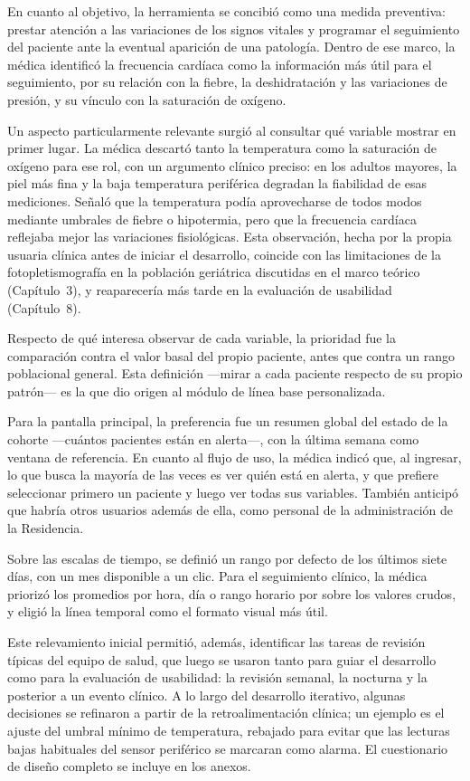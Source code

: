 \documentclass[12pt,a4paper]{article}
\begin{document}
    En cuanto al objetivo, la herramienta se concibió como una medida preventiva: prestar atención a las variaciones de los signos vitales y programar el seguimiento del paciente ante la eventual aparición de una patología. Dentro de ese marco, la médica identificó la frecuencia cardíaca como la información más útil para el seguimiento, por su relación con la fiebre, la deshidratación y las variaciones de presión, y su vínculo con la saturación de oxígeno.

    Un aspecto particularmente relevante surgió al consultar qué variable mostrar en primer lugar. La médica descartó tanto la temperatura como la saturación de oxígeno para ese rol, con un argumento clínico preciso: en los adultos mayores, la piel más fina y la baja temperatura periférica degradan la fiabilidad de esas mediciones. Señaló que la temperatura podía aprovecharse de todos modos mediante umbrales de fiebre o hipotermia, pero que la frecuencia cardíaca reflejaba mejor las variaciones fisiológicas. Esta observación, hecha por la propia usuaria clínica antes de iniciar el desarrollo, coincide con las limitaciones de la fotopletismografía en la población geriátrica discutidas en el marco teórico (Capítulo~3), y reaparecería más tarde en la evaluación de usabilidad (Capítulo~8).

    Respecto de qué interesa observar de cada variable, la prioridad fue la comparación contra el valor basal del propio paciente, antes que contra un rango poblacional general. Esta definición —mirar a cada paciente respecto de su propio patrón— es la que dio origen al módulo de línea base personalizada.

    Para la pantalla principal, la preferencia fue un resumen global del estado de la cohorte —cuántos pacientes están en alerta—, con la última semana como ventana de referencia. En cuanto al flujo de uso, la médica indicó que, al ingresar, lo que busca la mayoría de las veces es ver quién está en alerta, y que prefiere seleccionar primero un paciente y luego ver todas sus variables. También anticipó que habría otros usuarios además de ella, como personal de la administración de la Residencia.

    Sobre las escalas de tiempo, se definió un rango por defecto de los últimos siete días, con un mes disponible a un clic. Para el seguimiento clínico, la médica priorizó los promedios por hora, día o rango horario por sobre los valores crudos, y eligió la línea temporal como el formato visual más útil.

    Este relevamiento inicial permitió, además, identificar las tareas de revisión típicas del equipo de salud, que luego se usaron tanto para guiar el desarrollo como para la evaluación de usabilidad: la revisión semanal, la nocturna y la posterior a un evento clínico. A lo largo del desarrollo iterativo, algunas decisiones se refinaron a partir de la retroalimentación clínica; un ejemplo es el ajuste del umbral mínimo de temperatura, rebajado para evitar que las lecturas bajas habituales del sensor periférico se marcaran como alarma. El cuestionario de diseño completo se incluye en los anexos.
\end{document}
